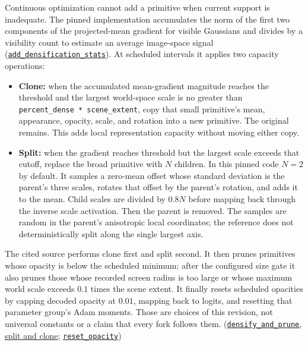 Continuous optimization cannot add a primitive when current support is inadequate. The pinned implementation accumulates the norm of the first two components of the projected-mean gradient for visible Gaussians and divides by a visibility count to estimate an average image-space signal (\href{https://github.com/graphdeco-inria/gaussian-splatting/blob/54c035f7834b564019656c3e3fcc3646292f727d/scene/gaussian_model.py\#L471-L472}{\texttt{add\_densification\_stats}}). At scheduled intervals it applies two capacity operations:

\begin{itemize}
\tightlist
\item
  \textbf{Clone:} when the accumulated mean-gradient magnitude reaches the threshold and the largest world-space scale is no greater than \texttt{percent\_dense\ *\ scene\_extent}, copy that small primitive's mean, appearance, opacity, scale, and rotation into a new primitive. The original remains. This adds local representation capacity without moving either copy.
\item
  \textbf{Split:} when the gradient reaches threshold but the largest scale exceeds that cutoff, replace the broad primitive with \(N\) children. In this pinned code \(N=2\) by default. It samples a zero-mean offset whose standard deviation is the parent's three scales, rotates that offset by the parent's rotation, and adds it to the mean. Child scales are divided by \(0.8N\) before mapping back through the inverse scale activation. Then the parent is removed. The samples are random in the parent's anisotropic local coordinates; the reference does not deterministically split along the single largest axis.
\end{itemize}

The cited source performs clone first and split second. It then prunes primitives whose opacity is below the scheduled minimum; after the configured size gate it also prunes those whose recorded screen radius is too large or whose maximum world scale exceeds \(0.1\) times the scene extent. It finally resets scheduled opacities by capping decoded opacity at \(0.01\), mapping back to logits, and resetting that parameter group's Adam moments. Those are choices of this revision, not universal constants or a claim that every fork follows them. (\href{https://github.com/graphdeco-inria/gaussian-splatting/blob/54c035f7834b564019656c3e3fcc3646292f727d/scene/gaussian_model.py\#L409-L472}{\texttt{densify\_and\_prune}, split and clone}; \href{https://github.com/graphdeco-inria/gaussian-splatting/blob/54c035f7834b564019656c3e3fcc3646292f727d/scene/gaussian_model.py\#L258-L261}{\texttt{reset\_opacity}})

